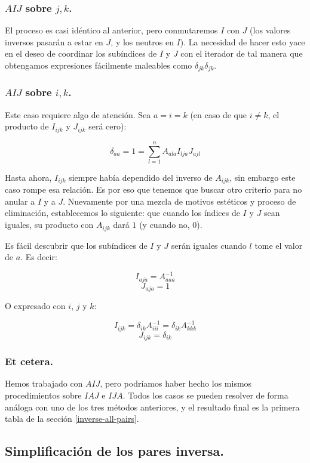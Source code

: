 \subsubsection{$AIJ$ sobre $j, k$.}

El proceso es casi idéntico al anterior, pero conmutaremos $I$ con $J$ (los valores inversos pasarán a estar en $J$, y los neutros en $I$). La necesidad de hacer esto yace en el deseo de coordinar los subíndices de $I$ y $J$ con el iterador de tal manera que obtengamos expresiones fácilmente maleables como $\delta_{jk} \delta_{jk}$.

\subsubsection{$AIJ$ sobre $i, k$.}

Este caso requiere algo de atención. Sea $a = i = k$ (en caso de que $i \neq k$, el producto de $I_{ijk}$ y $J_{ijk}$ será cero):

$$\delta_{aa} = 1 = \sum\limits_{l = 1}^{n} A_{ala} I_{lja} J_{ajl}$$

Hasta ahora, $I_{ijk}$ siempre había dependido del inverso de $A_{ijk}$, sin embargo este caso rompe esa relación. Es por eso que tenemos que buscar otro criterio para no anular a $I$ y a $J$. Nuevamente por una mezcla de motivos estéticos y proceso de eliminación, establecemos lo siguiente: que cuando los índices de $I$ y $J$ sean iguales, su producto con $A_{ijk}$ dará $1$ (y cuando no, $0$).

Es fácil descubrir que los subíndices de $I$ y $J$ serán iguales cuando $l$ tome el valor de $a$. Es decir:

$$I_{aja} = A_{aaa}^{-1}$$
$$J_{aja} = 1$$

O expresado con $i$, $j$ y $k$:

$$I_{ijk} = \delta_{ik} A_{iii}^{-1} = \delta_{ik} A_{kkk}^{-1}$$
$$J_{ijk} = \delta_{ik}$$

\subsubsection{Et cetera.}

Hemos trabajado con $AIJ$, pero podríamos haber hecho los mismos procedimientos sobre $IAJ$ e $IJA$. Todos los casos se pueden resolver de forma análoga con uno de los tres métodos anteriores, y el resultado final es la primera tabla de la sección \ref{inverse-all-pairs}.

\subsection{Simplificación de los pares inversa.} \label{appendix-4}

